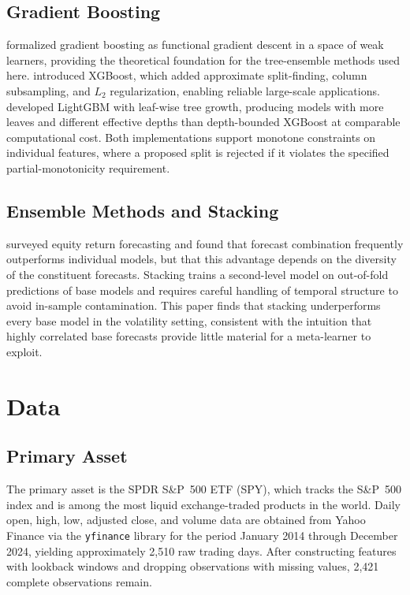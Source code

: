 \documentclass[12pt]{article}
\begin{document}
\subsection*{Gradient Boosting}

\citet{Friedman2001} formalized gradient boosting as functional gradient
descent in a space of weak learners, providing the theoretical foundation for
the tree-ensemble methods used here.  \citet{ChenGuestrin2016} introduced
XGBoost, which added approximate split-finding, column subsampling, and
$L_2$ regularization, enabling reliable large-scale applications.
\citet{KeMengEtAl2017} developed LightGBM with leaf-wise tree growth,
producing models with more leaves and different effective depths than
depth-bounded XGBoost at comparable computational cost.  Both implementations
support monotone constraints on individual features, where a proposed split is
rejected if it violates the specified partial-monotonicity requirement.

\subsection*{Ensemble Methods and Stacking}

\citet{RapachZhou2013} surveyed equity return forecasting and found that
forecast combination frequently outperforms individual models, but that this
advantage depends on the diversity of the constituent forecasts.  Stacking
trains a second-level model on out-of-fold predictions of base models and
requires careful handling of temporal structure to avoid in-sample contamination.
This paper finds that stacking underperforms every base model in the volatility
setting, consistent with the intuition that highly correlated base forecasts
provide little material for a meta-learner to exploit.


\section{Data}
\label{sec:data}

\subsection*{Primary Asset}

The primary asset is the SPDR S\&P~500 ETF (SPY), which tracks the
S\&P~500 index and is among the most liquid exchange-traded products in the
world.  Daily open, high, low, adjusted close, and volume data are obtained
from Yahoo Finance via the \texttt{yfinance} library for the period January
2014 through December 2024, yielding approximately 2,510 raw trading days.
After constructing features with lookback windows and dropping observations
with missing values, 2,421 complete observations remain.
\end{document}
